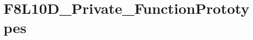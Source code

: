\hypertarget{group___f8_l10_d___private___function_prototypes}{}\section{F8\+L10\+D\+\_\+\+Private\+\_\+\+Function\+Prototypes}
\label{group___f8_l10_d___private___function_prototypes}
